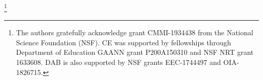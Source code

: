 \documentclass[twocolumn,10pt]{asme2ej}
\begin{document}
\begin{acknowledgment}
	\thanks{
		The authors gratefully acknowledge grant CMMI-1934438 from the National Science Foundation (NSF). CE was supported by fellowships through Department of Education GAANN grant P200A150310 and NSF NRT grant 1633608. DAB is also supported by NSF grants EEC-1744497 and OIA-1826715.}
\end{acknowledgment}

%




\end{document}
